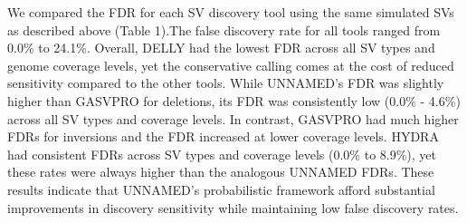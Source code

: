 \documentclass[11pt]{article}
\begin{document}
We compared the FDR for each SV discovery tool using the same simulated
SVs as described above (Table 1).The false discovery rate for all tools ranged 
from 0.0\% to 24.1\%. Overall, DELLY had the lowest FDR across all SV types
and genome coverage levels, yet the conservative calling comes at the cost of
reduced sensitivity compared to the other tools. While UNNAMED's FDR was 
slightly higher than GASVPRO for deletions, its FDR was consistently 
low (0.0\% - 4.6\%) across all SV types and coverage levels. In contrast, 
GASVPRO had much higher FDRs for inversions and
the FDR increased at lower coverage levels.  HYDRA had consistent FDRs across
SV types and coverage levels (0.0\% to 8.9\%), yet these rates were always 
higher than the analogous UNNAMED FDRs. These results indicate that UNNAMED's
probabilistic framework afford substantial improvements in discovery
sensitivity while maintaining low false discovery rates.
\end{document}
